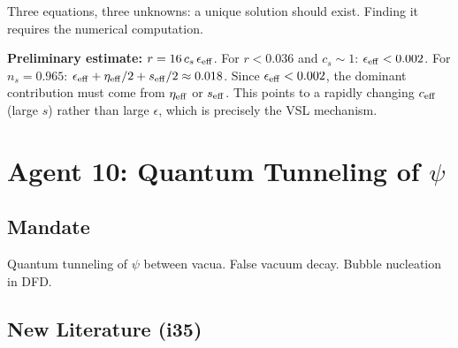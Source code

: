 \documentclass[11pt,a4paper]{article}
\begin{document}
Three equations, three unknowns: a unique solution should exist. Finding it requires the numerical computation.

\textbf{Preliminary estimate:} $r = 16\,c_s\,\epsilon_{\rm eff}$. For $r < 0.036$ and $c_s \sim 1$: $\epsilon_{\rm eff} < 0.002$. For $n_s = 0.965$: $\epsilon_{\rm eff} + \eta_{\rm eff}/2 + s_{\rm eff}/2 \approx 0.018$. Since $\epsilon_{\rm eff} < 0.002$, the dominant contribution must come from $\eta_{\rm eff}$ or $s_{\rm eff}$. This points to a rapidly changing $c_{\rm eff}$ (large $s$) rather than large $\epsilon$, which is precisely the VSL mechanism.

\newpage
\section{Agent 10: Quantum Tunneling of $\psi$}
\label{sec:agent10}

\subsection{Mandate}

Quantum tunneling of $\psi$ between vacua. False vacuum decay. Bubble nucleation in DFD.

\subsection{New Literature (i35)}
\end{document}
